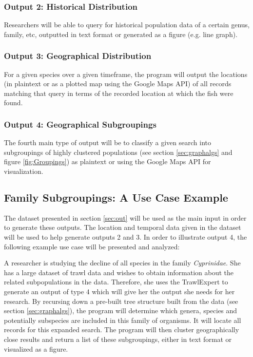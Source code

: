 \documentclass{article}
\begin{document}
\subsubsection{Output 2: Historical Distribution}
Researchers will be able to query for historical population data of a certain genus, family, etc, outputted in text format or generated as a figure (e.g. line graph).

\subsubsection{Output 3: Geographical Distribution}
For a given species over a given timeframe, the program will output the locations (in plaintext or as a plotted map using the Google Maps API) of all records matching that query in terms of the recorded location at which the fish were found.

\subsubsection{Output 4: Geographical Subgroupings}\label{sec:subgroup}
The fourth main type of output will be to classify a given search into subgroupings of highly clustered populations (see section \ref{sec:graphalgs} and figure \ref{fig:Groupings}) as plaintext or using the Google Maps API for visualization.

\subsection{Family Subgroupings: A Use Case Example}\label{sec:case}
The dataset presented in section \ref{sec:out} will be used as the main input in order to generate these outputs. The location and temporal data given in the dataset will be used to help generate outputs 2 and 3. In order to illustrate output 4, the following example use case will be presented and analyzed:

A researcher is studying the decline of all species in the family \textit{Cyprinidae}. She has a large dataset of trawl data and wishes to obtain information about the related subpopulations in the data. Therefore, she uses the TrawlExpert to generate an output of type 4 which will give her the output she needs for her research. By recursing down a pre-built tree structure built from the data (see section \ref{sec:graphalgs}), the program will determine which genera, species and potentially subspecies are included in this family of organisms. It will locate all records for this expanded search. The program will then cluster geographically close results and return a list of these subgroupings, either in text format or visualized as a figure.
\end{document}
